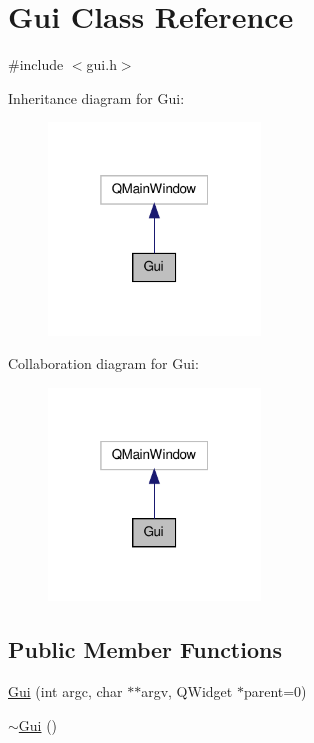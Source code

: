 \hypertarget{classGui}{\section{Gui Class Reference}
\label{classGui}
}


{\ttfamily \#include $<$gui.\-h$>$}



Inheritance diagram for Gui\-:\nopagebreak
\begin{figure}[H]
\begin{center}
\leavevmode
\includegraphics[width=160pt]{classGui__inherit__graph}
\end{center}
\end{figure}


Collaboration diagram for Gui\-:\nopagebreak
\begin{figure}[H]
\begin{center}
\leavevmode
\includegraphics[width=160pt]{classGui__coll__graph}
\end{center}
\end{figure}
\subsection*{Public Member Functions}
\begin{DoxyCompactItemize}
\item 
\hyperlink{classGui_a797b7ddfe4c19abb19a37255de3eaefe}{Gui} (int argc, char $\ast$$\ast$argv, Q\-Widget $\ast$parent=0)
\item 
\hyperlink{classGui_a4fd8485d226f9b8a2ac2d81d7f0f3598}{$\sim$\-Gui} ()
\end{DoxyCompactItemize}


